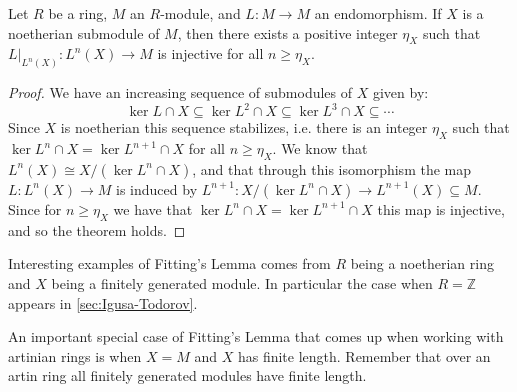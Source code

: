 \begin{theorem}\label{thm:Fittings_lemma}
	Let $R$ be a ring, $M$ an $R$-module, and $L\colon M \to M$ an endomorphism. If $X$ is a noetherian submodule of $M$, then there exists a positive integer $\eta_X$ such that $L|_{L^n(X)}\colon L^n(X) \to M$ is injective for all $n \geq \eta_X$.
	\begin{proof}
		We have an increasing sequence of submodules of $X$ given by:
		$$\ker L \cap X \subseteq \ker L^2 \cap X \subseteq \ker L^3 \cap X \subseteq \cdots$$
		Since $X$ is noetherian this sequence stabilizes, i.e. there is an integer $\eta_X$ such that $\ker L^n \cap X = \ker L^{n+1} \cap X$ for all $n \geq \eta_X$. We know that $L^n(X) \cong X / (\ker L^n \cap X)$, and that through this isomorphism the map $L \colon L^n(X) \to M$ is induced by $L^{n+1} \colon X / (\ker L^n \cap X) \to L^{n+1}(X) \subseteq M$. Since for $n \geq \eta_X$ we have that $\ker L^n \cap X = \ker L^{n+1}\cap X$ this map is injective, and so the theorem holds.
	\end{proof}
\end{theorem}

Interesting examples of Fitting's Lemma comes from $R$ being a noetherian ring and $X$ being a finitely generated module. In particular the case when $R = \mathbb Z$ appears in \cref{sec:Igusa-Todorov}. 

An important special case of Fitting's Lemma that comes up when working with artinian rings is when $X=M$ and $X$ has finite length. Remember that over an artin ring all finitely generated modules have finite length.

